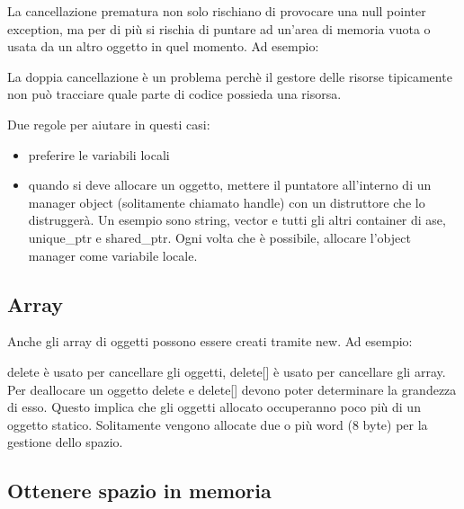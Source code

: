 \documentclass[11pt,a4paper]{book}
\begin{document}
La cancellazione prematura non solo rischiano di provocare una null pointer exception, ma per di più si rischia di puntare ad un'area di memoria vuota o usata da un altro oggetto in quel momento. Ad esempio:
\label{code: 156}

La doppia cancellazione è un problema perchè il gestore delle risorse tipicamente non può tracciare quale parte di codice possieda una risorsa.
\label{code: 157}

Due regole per aiutare in questi casi:
\begin{itemize}
	\item preferire le variabili locali
	\item quando si deve allocare un oggetto, mettere il puntatore all'interno di un manager object (solitamente chiamato handle) con un distruttore che lo distruggerà. Un esempio sono string, vector e tutti gli altri container di ase, unique\_ptr e shared\_ptr. Ogni volta che è possibile, allocare l'object manager come variabile locale.
\end{itemize}

\subsection{Array}
Anche gli array di oggetti possono essere creati tramite new. Ad esempio:
\label{code: 158}

delete è usato per cancellare gli oggetti, delete[] è usato per cancellare gli array. Per deallocare un oggetto delete e delete[] devono poter determinare la grandezza di esso. Questo implica che gli oggetti allocato occuperanno poco più di un oggetto statico. Solitamente vengono allocate due o più word (8 byte) per la gestione dello spazio.

\subsection{Ottenere spazio in memoria}
\end{document}
